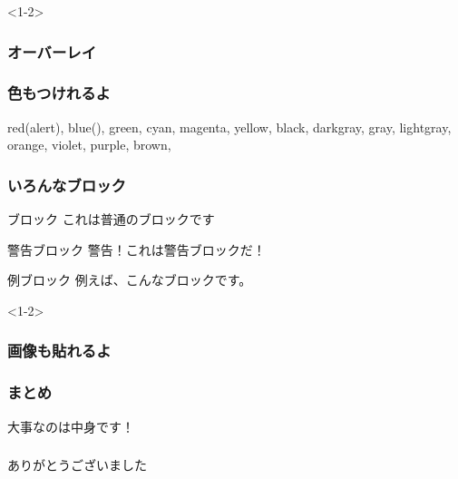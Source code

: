\documentclass[dvipdfmx,10pt,notheorems]{beamer}
\theoremstyle{definition}
\newtheorem{theorem}{定理}
\begin{document}
\begin{frame}<1-2>\frametitle{オーバーレイ}
\end{frame}

\begin{frame}\frametitle{色もつけれるよ}
  {\color{red} red}(\alert{alert}),
  {\color{blue} blue}(),
  {\color{green} green},
  {\color{cyan} cyan},
  {\color{magenta} magenta},
  {\color{yellow} yellow},
  {\color{black} black},
  {\color{darkgray} darkgray},
  {\color{gray} gray},
  {\color{lightgray} lightgray},
  {\color{orange} orange},
  {\color{violet} violet},
  {\color{purple} purple},
  {\color{brown} brown},
\end{frame}

\begin{frame}\frametitle{いろんなブロック}
\begin{block}{ブロック}
これは普通のブロックです
\end{block}

\begin{alertblock}{警告ブロック}
警告！これは警告ブロックだ！
\end{alertblock}

\begin{exampleblock}{例ブロック}
例えば、こんなブロックです。
\end{exampleblock}
\end{frame}

\begin{frame}<1-2>\frametitle{画像も貼れるよ}
\end{frame}

\begin{frame}\frametitle{まとめ}
\LARGE{大事なのは中身です！}
\end{frame}

\begin{frame}\frametitle{}
{\Large ありがとうございました}
\end{frame}
\appendix
\end{document}
